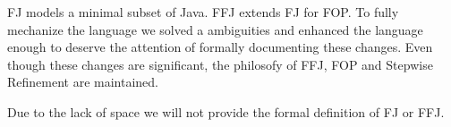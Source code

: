 \ac{FJ} models a minimal subset of Java. \ac{FFJ} extends \ac{FJ} for \ac{FOP}.
To fully mechanize the language we solved a ambiguities and enhanced the language enough
to deserve the attention of formally documenting these changes. 
Even though these changes are significant, the philosofy of \ac{FFJ}, \ac{FOP} and Stepwise Refinement are maintained.




Due to the lack of space
we will not provide the formal definition of \ac{FJ} or \ac{FFJ}.
